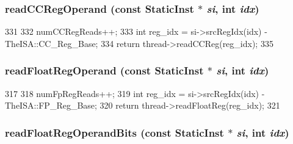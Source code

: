 \hypertarget{classBaseSimpleCPU_abbb38b103304a528dca50350209e8f82}{
\subsubsection[{readCCRegOperand}]{ readCCRegOperand (const {\bf StaticInst} $\ast$ {\em si}, \/  int {\em idx})}}
\label{classBaseSimpleCPU_abbb38b103304a528dca50350209e8f82}



\begin{DoxyCode}
331     {
332         numCCRegReads++;
333         int reg_idx = si->srcRegIdx(idx) - TheISA::CC_Reg_Base;
334         return thread->readCCReg(reg_idx);
335     }
\end{DoxyCode}
\hypertarget{classBaseSimpleCPU_a717c88c8c56d79c9ed554ba5992bd8c3}{
\subsubsection[{readFloatRegOperand}]{ readFloatRegOperand (const {\bf StaticInst} $\ast$ {\em si}, \/  int {\em idx})}}
\label{classBaseSimpleCPU_a717c88c8c56d79c9ed554ba5992bd8c3}



\begin{DoxyCode}
317     {
318         numFpRegReads++;
319         int reg_idx = si->srcRegIdx(idx) - TheISA::FP_Reg_Base;
320         return thread->readFloatReg(reg_idx);
321     }
\end{DoxyCode}
\hypertarget{classBaseSimpleCPU_a39d93624e4481f4a210f2c46ea6b15b0}{
\subsubsection[{readFloatRegOperandBits}]{ readFloatRegOperandBits (const {\bf StaticInst} $\ast$ {\em si}, \/  int {\em idx})}}
\label{classBaseSimpleCPU_a39d93624e4481f4a210f2c46ea6b15b0}



